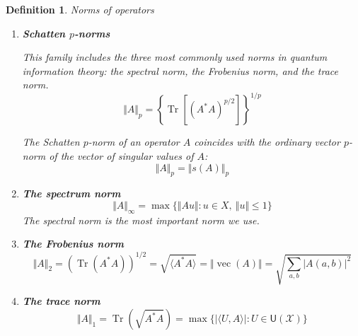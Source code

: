 \documentclass[aps,pra,onecolumn,notitlepage,superscriptaddress]{revtex4-1}
\newcommand{\spc}[1]{\mathcal{#1}}
\newcommand{\U}{\mathsf{U}}
\def\>{\rangle}
\def\<{\langle}
\newcommand{\Tr}{\operatorname{Tr}}
\newcommand{\op}[1]{\operatorname{#1}}
\newtheorem{defi}{Definition}
\begin{document}
    \begin{defi}
        Norms of operators
        \begin{enumerate}
            \item \textbf{Schatten $p$-norms}

            This family includes the three most commonly used norms in quantum information theory: the spectral norm, the Frobenius norm, and the trace norm.
            \begin{equation}
                \Vert A \Vert_p = \left\{ \Tr \left[ \left( A^*A \right)^{p/2} \right] \right\}^{1/p}
            \end{equation}

            The Schatten $p$-norm of an operator $A$ coincides with the ordinary vector $p$-norm of the vector of singular values of $A$:
            \begin{equation}
                \Vert A \Vert_p = \Vert s(A) \Vert_p
            \end{equation}

            \item \textbf{The spectrum norm}
            \begin{equation}
                \Vert A \Vert_\infty = \max \{ \Vert Au \Vert : u \in X, \ \Vert u \Vert \leq 1 \}
            \end{equation}
            The spectral norm is the most important norm we use.

            \item \textbf{The Frobenius norm} 
            \begin{equation}
                \Vert A \Vert_2 = (\Tr(A^*A))^{1/2} = \sqrt{\< A^*A \>} = \Vert \op{vec}(A) \Vert = \sqrt{\sum_{a,b} |A(a,b)|^2 }
            \end{equation}

            \item \textbf{The trace norm} 
            \begin{equation}
                \Vert A \Vert_1 = \Tr(\sqrt{A^*A}) = \max\{ |\< U,A \>| : U \in \U(\spc X) \}
            \end{equation}
        \end{enumerate}
    \end{defi}
\end{document}
